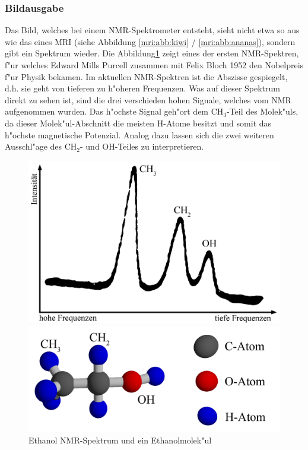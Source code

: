 \subsubsection{Bildausgabe}
Das Bild, welches bei einem NMR-Spektrometer entsteht, sieht nicht etwa so aus wie das eines MRI (siehe Abbildung \ref{mri:abb:kiwi} / \ref{mri:abb:ananas}), sondern gibt ein Spektrum wieder. Die Abbildung\;\ref{mri:bsp:abb:Etanolspektrum} zeigt eines der ersten NMR-Spektren, f"ur welches Edward Mills Purcell zusammen mit Felix Bloch 1952 den Nobelpreis f"ur Physik bekamen. Im aktuellen NMR-Spektren ist die Abszisse gespiegelt, d.h. sie geht von tieferen zu h"oheren Frequenzen. Was auf dieser Spektrum direkt zu sehen ist, sind die drei verschieden hohen Signale, welches vom NMR aufgenommen wurden. Das h"ochste Signal geh"ort dem $\mathrm{CH_3}$-Teil des Molek"uls, da dieser Molek"ul-Abschnitt die meisten H-Atome besitzt und somit das h"ochste magnetische Potenzial. Analog dazu lassen sich die zwei weiteren Ausschl"age des $\mathrm{CH_2}$- und OH-Teiles zu interpretieren. 
\begin{figure}[h]
	\centering
	\begin{minipage}{0.55\textwidth}
		\includegraphics[width = \textwidth]{./mri/pic/CW_SpektrumEthanol.png}
	\end{minipage}
	\begin{minipage}{0.42\textwidth}
		\includegraphics[width = \textwidth]{./mri/pic/Ethanol.png}
	\end{minipage}
	\caption{Ethanol NMR-Spektrum \cite{skript:mri:NMRSkopie} und ein Ethanolmolek"ul}
	\label{mri:bsp:abb:Etanolspektrum}
\end{figure}
